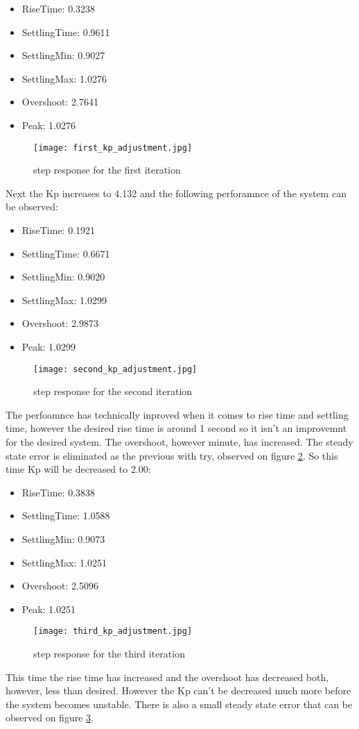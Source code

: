 \documentclass[12pt]{article}
\begin{document}
\begin{itemize}
  \item RiseTime: 0.3238
  \item SettlingTime: 0.9611
  \item SettlingMin: 0.9027
  \item SettlingMax: 1.0276
  \item Overshoot: 2.7641
  \item Peak: 1.0276
\end{itemize}
\begin{figure}[htbp]
  \centering
  \texttt{[image: first\_kp\_adjustment.jpg]}
  \caption{step response for the first iteration} \label{my_first_step}
\end{figure}
Next the Kp increases to 4.132 and the following perforamnce of the system can be observed:
\begin{itemize}
  \item RiseTime: 0.1921
  \item SettlingTime: 0.6671
  \item SettlingMin: 0.9020
  \item SettlingMax: 1.0299
  \item Overshoot: 2.9873
  \item Peak: 1.0299
\end{itemize}
\begin{figure}[htbp]
  \centering
  \texttt{[image: second\_kp\_adjustment.jpg]}
  \caption{step response for the second iteration} \label{my_second_step}
\end{figure}
The perfoamnce has technically inproved when it comes to rise time and settling time, however the desired rise time is around 1 second so it isn't an improvemnt for the desired system. The overshoot, however minute, has increased. The steady state error is eliminated as the previous with try, observed on figure \ref{my_second_step}. So this time Kp will be decreased to 2.00:
\begin{itemize}
  \item RiseTime: 0.3838
  \item SettlingTime: 1.0588
  \item SettlingMin: 0.9073
  \item SettlingMax:  1.0251
  \item Overshoot: 2.5096
  \item Peak: 1.0251
\end{itemize}
\begin{figure}[htbp]
  \centering
  \texttt{[image: third\_kp\_adjustment.jpg]}
  \caption{step response for the third iteration} \label{my_third_step}
\end{figure}
This time the rise time has increased and the overshoot has decreased both, however, less than desired. However the Kp can't be decreased much more before the system becomes unstable. There is also a small steady state error that can be observed on figure \ref{my_third_step}.
\end{document}
